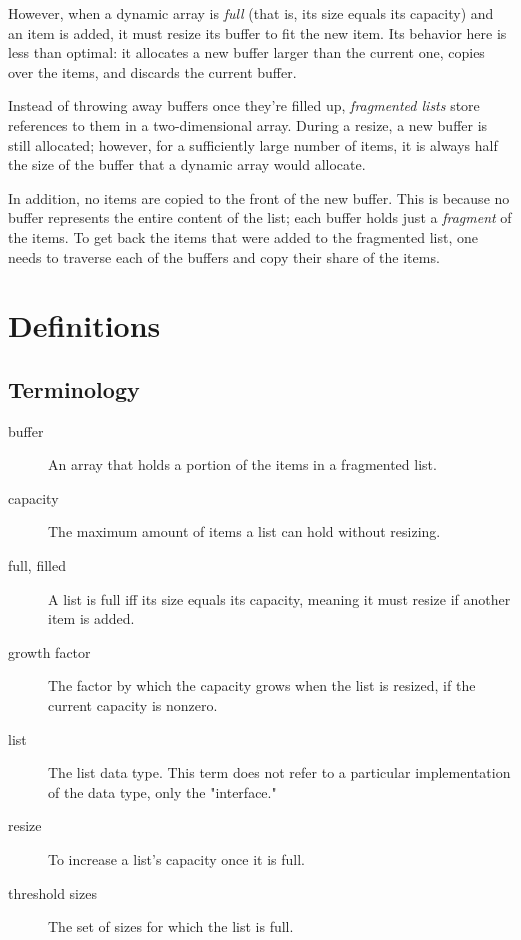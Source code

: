 \documentclass{article}
\begin{document}
	However, when a dynamic array is \textit{full} (that is, its size equals its capacity) and an item is added, it must resize its buffer to fit the new item. Its behavior here is less than optimal: it allocates a new buffer larger than the current one, copies over the items, and discards the current buffer.
	
	Instead of throwing away buffers once they're filled up, \textit{fragmented lists} store references to them in a two-dimensional array. During a resize, a new buffer is still allocated; however, for a sufficiently large number of items, it is always half the size of the buffer that a dynamic array would allocate.
	
	In addition, no items are copied to the front of the new buffer. This is because no buffer represents the entire content of the list; each buffer holds just a \textit{fragment} of the items. To get back the items that were added to the fragmented list, one needs to traverse each of the buffers and copy their share of the items.
	

	\section{Definitions}
	\label{Definitions}
	
	\subsection{Terminology}
	
	\begin{description}
		\item[buffer] An array that holds a portion of the items in a fragmented list.
		\item[capacity] The maximum amount of items a list can hold without resizing.
		\item[full, filled] A list is full iff its size equals its capacity, meaning it must resize if another item is added.
		\item[growth factor] The factor by which the capacity grows when the list is resized, if the current capacity is nonzero.
		\item[list] The list data type. This term does not refer to a particular implementation of the data type, only the "interface."
		\item[resize] To increase a list's capacity once it is full.
		\item[threshold sizes] The set of sizes for which the list is full.
	\end{description}
\end{document}
